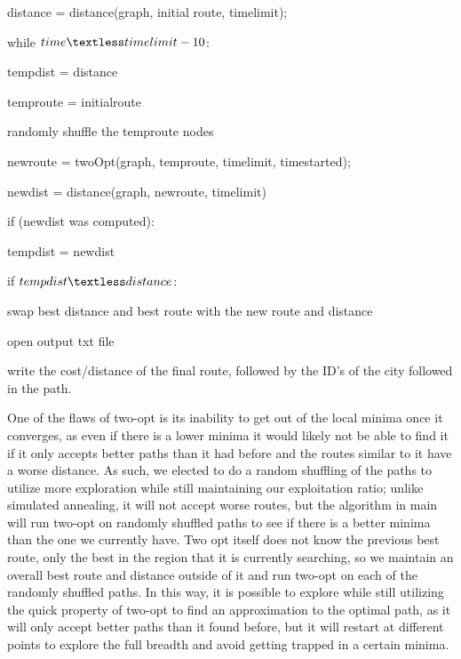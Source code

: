 \documentclass[11pt]{article}
\begin{document}
			\quad \quad distance = distance(graph, initial route, timelimit);

			\quad \quad while $time \textless timelimit - 10$:

				\quad \quad \quad tempdist = distance

				\quad \quad \quad temproute = initialroute

				\quad \quad \quad randomly shuffle the temproute nodes

				\quad \quad \quad newroute = twoOpt(graph, temproute, timelimit, timestarted);

				\quad \quad \quad newdist = distance(graph, newroute, timelimit)

				\quad \quad \quad if (newdist was computed):

				\quad \quad \quad \quad	tempdist = newdist

				\quad \quad \quad if $tempdist \textless distance$:

					\quad \quad \quad \quad swap best distance and best route with the new route and distance

			\quad \quad open output txt file

			\quad \quad write the cost/distance of the final route, followed by the ID's of the city followed in the path.




One of the flaws of two-opt is its inability to get out of the local minima once it converges, as even if there is a lower minima it would likely not be able to find it if it only accepts better paths than it had before and the routes similar to it have a worse distance. As such, we elected to do a random shuffling of the paths to utilize more exploration while still maintaining our exploitation ratio; unlike simulated annealing, it will not accept worse routes, but the algorithm in main will run two-opt on randomly shuffled paths to see if there is a better minima than the one we currently have. Two opt itself does not know the previous best route, only the best in the region that it is currently searching, so we maintain an overall best route and distance outside of it and run two-opt on each of the randomly shuffled paths. In this way, it is possible to explore while still utilizing the quick property of two-opt to find an approximation to the optimal path, as it will only accept better paths than it found before, but it will restart at different points to explore the full breadth and avoid getting trapped in a certain minima.
			
\end{document}
